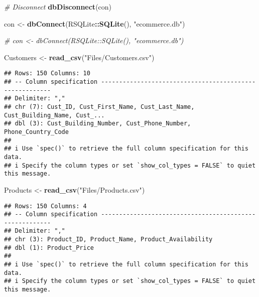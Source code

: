 \documentclass[
]{article}
\newenvironment{Shaded}{\begin{snugshade}}{\end{snugshade}}
\newcommand{\CommentTok}[1]{\textcolor[rgb]{0.56,0.35,0.01}{\textit{#1}}}
\newcommand{\FunctionTok}[1]{\textcolor[rgb]{0.13,0.29,0.53}{\textbf{#1}}}
\newcommand{\NormalTok}[1]{#1}
\newcommand{\OtherTok}[1]{\textcolor[rgb]{0.56,0.35,0.01}{#1}}
\newcommand{\SpecialCharTok}[1]{\textcolor[rgb]{0.81,0.36,0.00}{\textbf{#1}}}
\newcommand{\StringTok}[1]{\textcolor[rgb]{0.31,0.60,0.02}{#1}}
\begin{document}
\begin{Shaded}
\begin{Highlighting}[]
\CommentTok{\# Disconnect}
\FunctionTok{dbDisconnect}\NormalTok{(con)}
\end{Highlighting}
\end{Shaded}

\begin{Shaded}
\begin{Highlighting}[]
\NormalTok{con }\OtherTok{\textless{}{-}} \FunctionTok{dbConnect}\NormalTok{(RSQLite}\SpecialCharTok{::}\FunctionTok{SQLite}\NormalTok{(), }\StringTok{"ecommerce.db"}\NormalTok{)}

\CommentTok{\# con \textless{}{-} dbConnect(RSQLite::SQLite(), "ecommerce.db")}


\NormalTok{Customers }\OtherTok{\textless{}{-}} \FunctionTok{read\_csv}\NormalTok{(}\StringTok{"Files/Customers.csv"}\NormalTok{)}
\end{Highlighting}
\end{Shaded}

\begin{verbatim}
## Rows: 150 Columns: 10
## -- Column specification --------------------------------------------------------
## Delimiter: ","
## chr (7): Cust_ID, Cust_First_Name, Cust_Last_Name, Cust_Building_Name, Cust_...
## dbl (3): Cust_Building_Number, Cust_Phone_Number, Phone_Country_Code
## 
## i Use `spec()` to retrieve the full column specification for this data.
## i Specify the column types or set `show_col_types = FALSE` to quiet this message.
\end{verbatim}

\begin{Shaded}
\begin{Highlighting}[]
\NormalTok{Products }\OtherTok{\textless{}{-}} \FunctionTok{read\_csv}\NormalTok{(}\StringTok{"Files/Products.csv"}\NormalTok{)}
\end{Highlighting}
\end{Shaded}

\begin{verbatim}
## Rows: 150 Columns: 4
## -- Column specification --------------------------------------------------------
## Delimiter: ","
## chr (3): Product_ID, Product_Name, Product_Availability
## dbl (1): Product_Price
## 
## i Use `spec()` to retrieve the full column specification for this data.
## i Specify the column types or set `show_col_types = FALSE` to quiet this message.
\end{verbatim}
\end{document}
